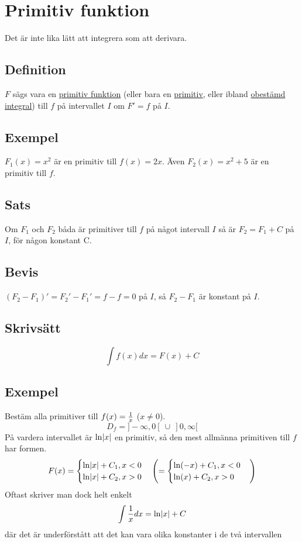 \documentclass{article}
\begin{document}
\section{Primitiv funktion}
Det är inte lika lätt att integrera som att derivara.
\subsection{Definition}
$F$ sägs vara en \uline{primitiv funktion} (eller bara en \uline{primitiv}, eller ibland \uline{obestämd integral}) till $f$ på intervallet $I$ om $F'=f$ på $I$.

\subsection{Exempel}
$ F_1(x)=x^2 $ är en primitiv till $f(x)=2x$.
Även $F_2(x)=x^2+5$ är en primitiv till $f$.

\subsection{Sats}
Om $F_1$ och $F_2$ båda är primitiver till $f$ på något intervall $I$ så är $F_2=F_1+C$ på $I$, för någon konstant C.

\subsection{Bevis}
$(F_2-F_1)' =F_2' - F_1' = f - f = 0$ på $I$, så $F_2-F_1$ är konstant på $I$.

\subsection{Skrivsätt}
$$\int{f(x) dx}= F(x) + C$$

\subsection{Exempel}
Bestäm alla primitiver till $f(x)=\frac{1}{x}$ ($x\neq 0$).
$$ D_f = ]-\infty, 0[\ \cup\ ]0,\infty[ $$
På vardera intervallet är $\ln \lvert x\rvert$ en primitiv, så den mest allmänna primitiven till $f$ har formen.
$$
F(x)=
\begin{cases}
  \ln \lvert x\rvert + C_1 ,x<0\\
  \ln \lvert x\rvert + C_2 ,x>0
\end{cases}
\left(
=\begin{cases}
  \ln(-x) + C_1 ,x<0\\
  \ln(x) + C_2 ,x>0
\end{cases}
\right)
$$
Oftast skriver man dock helt enkelt
$$ \int{\frac{1}{x} dx} = \ln \lvert x\rvert + C $$
där det är underförstått att det kan vara olika konstanter i de två intervallen
\end{document}

